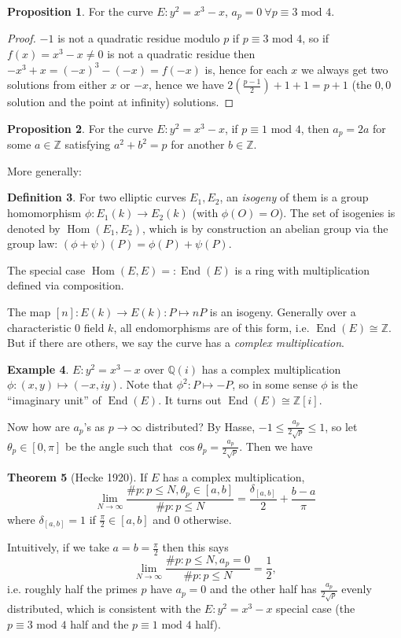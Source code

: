 \documentclass{article}
\newcommand{\Z}{\mathbb{Z}}
\newcommand{\Q}{\mathbb{Q}}
\newcommand{\Mod}{\text{ mod }}
\newcommand{\Hom}{\operatorname{Hom}}
\newcommand{\End}{\operatorname{End}}
\theoremstyle{definition}
\newtheorem{defn}{Definition}[subsection]
\newtheorem{prop}[defn]{Proposition}
\newtheorem{thm}[defn]{Theorem}
\newtheorem{example}[defn]{Example}
\begin{document}
\begin{prop}
For the curve $E:y^2=x^3-x$, $a_p=0 \ \forall p\equiv 3\Mod 4$.
\end{prop}
\begin{proof}
$-1$ is not a quadratic residue modulo $p$ if $p\equiv 3\Mod 4$, so if $f(x)=x^3-x\neq 0$ is not a quadratic residue then $-x^3+x=(-x)^3-(-x)=f(-x)$ is, hence for each $x$ we always get two solutions from either $x$ or $-x$, hence we have $2\left(\frac{p-1}{2}\right)+1+1=p+1$ (the $0,0$ solution and the point at infinity) solutions.
\end{proof}

\begin{prop}
For the curve $E:y^2=x^3-x$, if $p\equiv 1\Mod 4$, then $a_p=2a$ for some $a\in\Z$ satisfying $a^2+b^2=p$ for another $b\in\Z$.
\end{prop}

More generally:

\begin{defn}
For two elliptic curves $E_1,E_2$, an \textit{isogeny} of them is a group homomorphism $\phi:E_1(k)\rightarrow E_2(k)$ (with $\phi(O)=O$). The set of isogenies is denoted by $\Hom(E_1,E_2)$, which is by construction an abelian group via the group law: $(\phi+\psi)(P)=\phi(P)+\psi(P)$.

The special case $\Hom(E,E)=:\End(E)$ is a ring with multiplication defined via composition.
\end{defn}

The map $[n]:E(k)\rightarrow E(k):P\mapsto nP$ is an isogeny. Generally over a characteristic 0 field $k$, all endomorphisms are of this form, i.e. $\End(E)\cong\Z$. But if there are others, we say the curve has a \textit{complex multiplication}.

\begin{example}
$E:y^2=x^3-x$ over $\Q(i)$ has a complex multiplication $\phi:(x,y)\mapsto (-x,iy)$. Note that $\phi^2:P\mapsto -P$, so in some sense $\phi$ is the ``imaginary unit'' of $\End(E)$. It turns out $\End(E)\cong\Z[i]$.
\end{example}

Now how are $a_p$'s as $p\rightarrow\infty$ distributed? By Hasse, $-1\leq \frac{a_p}{2\sqrt p}\leq 1$, so let $\theta_p\in[0,\pi]$ be the angle such that $\cos\theta_p=\frac{a_p}{2\sqrt p}$. Then we have

\begin{thm}[Hecke 1920]
If $E$ has a complex multiplication,
\[
\lim_{N\rightarrow\infty}\frac{\# p:p\leq N,\theta_p\in [a,b]}{\# p:p\leq N}=\frac{\delta_{[a,b]}}{2}+\frac{b-a}{\pi}
\]
where $\delta_{[a,b]}=1$ if $\frac{\pi}{2}\in [a,b]$ and 0 otherwise.

Intuitively, if we take $a=b=\frac{\pi}{2}$ then this says
\[
\lim_{N\rightarrow\infty}\frac{\# p:p\leq N,a_p=0}{\# p:p\leq N}=\frac{1}{2},
\]
i.e. roughly half the primes $p$ have $a_p=0$ and the other half has $\frac{a_p}{2\sqrt p}$ evenly distributed, which is consistent with the $E:y^2=x^3-x$ special case (the $p\equiv 3\Mod 4$ half and the $p\equiv 1\Mod 4$ half).
\end{thm}
\end{document}
